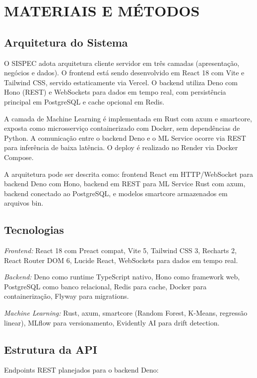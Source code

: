 \documentclass[12pt,a4paper]{article}
\begin{document}
\section{MATERIAIS E M\'ETODOS}

\subsection{Arquitetura do Sistema}

O SISPEC adota arquitetura cliente servidor em tr\^es camadas (apresenta\c c\~ao, neg\'ocios e dados). O frontend est\'a sendo desenvolvido em React 18 com Vite e Tailwind CSS, servido estaticamente via Vercel. O backend utiliza Deno com Hono (REST) e WebSockets para dados em tempo real, com persist\^encia principal em PostgreSQL e cache opcional em Redis.

A camada de Machine Learning \'e implementada em Rust com axum e smartcore, exposta como microsservi\c co containerizado com Docker, sem depend\^encias de Python. A comunica\c c\~ao entre o backend Deno e o ML Service ocorre via REST para infer\^encia de baixa lat\^encia. O deploy \'e realizado no Render via Docker Compose.

A arquitetura pode ser descrita como: frontend React em HTTP/WebSocket para backend Deno com Hono, backend em REST para ML Service Rust com axum, backend conectado ao PostgreSQL, e modelos smartcore armazenados em arquivos bin.

\subsection{Tecnologias}

\textit{Frontend:} React 18 com Preact compat, Vite 5, Tailwind CSS 3, Recharts 2, React Router DOM 6, Lucide React, WebSockets para dados em tempo real.

\textit{Backend:} Deno como runtime TypeScript nativo, Hono como framework web, PostgreSQL como banco relacional, Redis para cache, Docker para containeriza\c c\~ao, Flyway para migrations.

\textit{Machine Learning:} Rust, axum, smartcore (Random Forest, K-Means, regress\~ao linear), MLflow para versionamento, Evidently AI para drift detection.

\subsection{Estrutura da API}

Endpoints REST planejados para o backend Deno:
\end{document}
